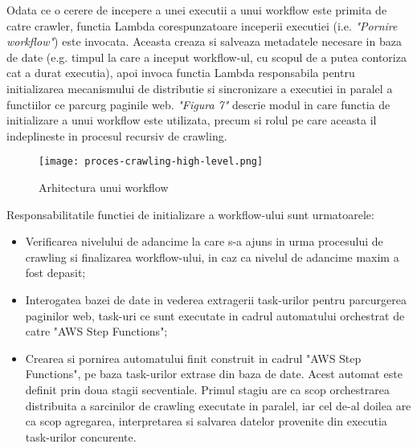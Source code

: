 Odata ce o cerere de incepere a unei executii a unui workflow este primita de catre crawler, functia Lambda corespunzatoare inceperii executiei (i.e. \textit{"Pornire workflow"}) este invocata. Aceasta creaza si salveaza metadatele necesare in baza de date (e.g. timpul la care a inceput workflow-ul, cu scopul de a putea contoriza cat a durat executia), apoi invoca functia Lambda responsabila pentru initializarea mecanismului de distributie si sincronizare a executiei in paralel a functiilor ce parcurg paginile web. \textit{"Figura 7"} descrie modul in care functia de initializare a unui workflow este utilizata, precum si rolul pe care aceasta il indeplineste in procesul recursiv de crawling.

\begin{figure}[ht]
\begin{center}
	\texttt{[image: proces-crawling-high-level.png]}
	\caption{Arhitectura unui workflow \cite{diagram-icons-sources, aws-icons-source}}\par\medskip 

\end{center}
\end{figure}

Responsabilitatile functiei de initializare a workflow-ului sunt urmatoarele:

\begin{itemize}
	\item{Verificarea nivelului de adancime la care s-a ajuns in urma procesului de crawling si finalizarea workflow-ului, in caz ca nivelul de adancime maxim a fost depasit;}
	\item{Interogatea bazei de date in vederea extragerii task-urilor pentru parcurgerea paginilor web, task-uri ce sunt executate in cadrul automatului orchestrat de catre "AWS Step Functions";}
	\item{Crearea si pornirea automatului finit construit in cadrul "AWS Step Functions", pe baza task-urilor extrase din baza de date. Acest automat este definit prin doua stagii secventiale. Primul stagiu are ca scop orchestrarea distribuita a sarcinilor de crawling executate in paralel, iar cel de-al doilea are ca scop agregarea, interpretarea si salvarea datelor provenite din executia task-urilor concurente.}
\end{itemize}
